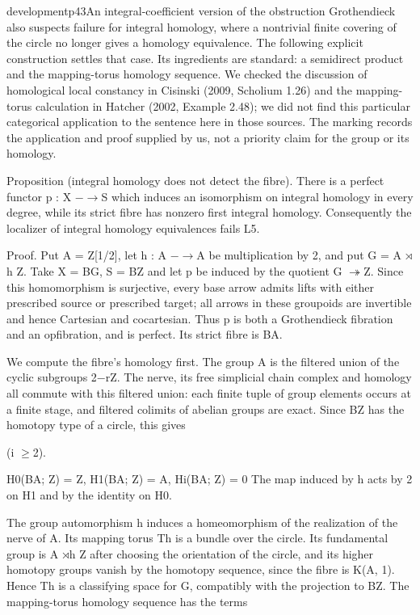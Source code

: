 \begin{dcomment}{development}{p43}{An integral-coefficient version of the obstruction}
Grothendieck also suspects failure for integral homology, where a nontrivial finite covering of the circle no longer gives a homology equivalence. The following explicit construction settles that case. Its ingredients are standard: a semidirect product and the mapping-torus homology sequence. We checked the discussion of homological local constancy in Cisinski (2009, Scholium 1.26) and the mapping-torus calculation in Hatcher (2002, Example 2.48); we did not find this particular categorical application to the sentence here in those sources. The marking records the application and proof supplied by us, not a priority claim for the group or its homology.

Proposition (integral homology does not detect the fibre). \ours There is a perfect functor p : X \ensuremath{-}\ensuremath{\to}S which induces an isomorphism on integral homology in every degree, while its strict fibre has nonzero first integral homology. Consequently the localizer of integral homology equivalences fails L5.

Proof. Put A = Z[1/2], let h : A \ensuremath{-}\ensuremath{\to}A be multiplication by 2, and put G = A \ensuremath{\rtimes}h Z. Take X = BG, S = BZ and let p be induced by the quotient G \ensuremath{\twoheadrightarrow}Z. Since this homomorphism is surjective, every base arrow admits lifts with either prescribed source or prescribed target; all arrows in these groupoids are invertible and hence Cartesian and cocartesian. Thus p is both a Grothendieck fibration and an opfibration, and is perfect. Its strict fibre is BA.

We compute the fibre’s homology first. The group A is the filtered union of the cyclic subgroups 2\ensuremath{-}rZ. The nerve, its free simplicial chain complex and homology all commute with this filtered union: each finite tuple of group elements occurs at a finite stage, and filtered colimits of abelian groups are exact. Since BZ has the homotopy type of a circle, this gives

(i \ensuremath{\geq}2).

H0(BA; Z) = Z, H1(BA; Z) = A, Hi(BA; Z) = 0 The map induced by h acts by 2 on H1 and by the identity on H0.

The group automorphism h induces a homeomorphism of the realization of the nerve of A. Its mapping torus Th is a bundle over the circle. Its fundamental group is A \ensuremath{\rtimes}h Z after choosing the orientation of the circle, and its higher homotopy groups vanish by the homotopy sequence, since the fibre is K(A, 1). Hence Th is a classifying space for G, compatibly with the projection to BZ. The mapping-torus homology sequence has the terms


\end{dcomment}
